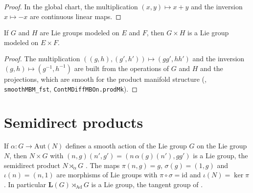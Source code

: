 \begin{proof}
  \leanok
  In the global chart, the multiplication $(x, y) \mapsto x + y$ and the inversion
  $x \mapsto -x$ are continuous linear maps.
\end{proof}

\begin{proposition}[Products]
  \label{prop:prod-group}
  \leanok
  If $G$ and $H$ are Lie groups modeled on $E$ and $F$, then $G \times H$ is a Lie group modeled
  on $E \times F$.
\end{proposition}

\begin{proof}
  \leanok
  The multiplication $((g, h), (g', h')) \mapsto (gg', hh')$ and the inversion
  $(g, h) \mapsto (g^{-1}, h^{-1})$ are built from the operations of $G$ and $H$ and the
  projections, which are smooth for the product manifold structure (\cite{LCM},
  \texttt{smoothMBM\_fst}, \texttt{ContMDiffMBOn.prodMk}).
\end{proof}

\section{Semidirect products}

\begin{theorem}
  \label{thm:semidirect}
  \leanok
  If $\alpha\colon G \to \mathrm{Aut}(N)$ defines a smooth action of the Lie group $G$ on the Lie
  group $N$, then $N \times G$ with $(n, g)(n', g') = (n\,\alpha(g)(n'), gg')$ is a Lie group, the
  semidirect product $N \rtimes_\alpha G$ \cite[Definition 5.2.7]{GN26}. The maps
  $\pi(n, g) = g$, $\sigma(g) = (1, g)$ and $\iota(n) = (n, 1)$ are morphisms of Lie groups with
  $\pi \circ \sigma = \mathrm{id}$ and $\iota(N) = \ker \pi$ \cite[Remark 5.2.10]{GN26}. In particular
  $\mathbf{L}(G) \rtimes_{\mathrm{Ad}} G$ is a Lie group, the tangent group of
  \cite[Example 5.2.12]{GN26}.
\end{theorem}


